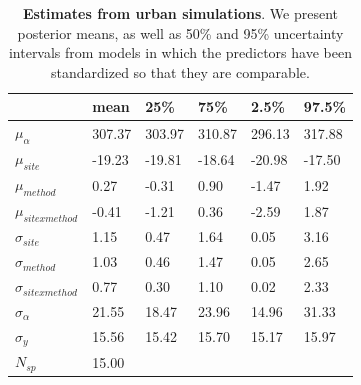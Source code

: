 \documentclass{article}\usepackage[]{graphicx}\usepackage[]{color}
\begin{document}
\begin{table}[ht]
\centering
\caption{\textbf{Estimates from urban simulations}. We present posterior means, as well as 50\% and 95\% uncertainty intervals from models in which the predictors have been standardized so that they are comparable.} 
\label{tab:urban}
\begingroup\footnotesize
\begin{tabular}{|p{}|p{}p{}p{}p{}p{}|}
  \hline
 & mean & 25\% & 75\% & 2.5\% & 97.5\% \\ 
  \hline
$\mu_{\alpha}$ & 307.37 & 303.97 & 310.87 & 296.13 & 317.88 \\ 
  $\mu_{site}$ & -19.23 & -19.81 & -18.64 & -20.98 & -17.50 \\ 
  $\mu_{method}$ & 0.27 & -0.31 & 0.90 & -1.47 & 1.92 \\ 
  $\mu_{sitexmethod}$ & -0.41 & -1.21 & 0.36 & -2.59 & 1.87 \\ 
  $\sigma_{site}$ & 1.15 & 0.47 & 1.64 & 0.05 & 3.16 \\ 
  $\sigma_{method}$ & 1.03 & 0.46 & 1.47 & 0.05 & 2.65 \\ 
  $\sigma_{sitexmethod}$ & 0.77 & 0.30 & 1.10 & 0.02 & 2.33 \\ 
  $\sigma_{\alpha}$ & 21.55 & 18.47 & 23.96 & 14.96 & 31.33 \\ 
  $\sigma_{y}$ & 15.56 & 15.42 & 15.70 & 15.17 & 15.97 \\ 
   \hline
$N_{sp}$ & 15.00 &  &  &  &  \\ 
   \hline
\end{tabular}
\endgroup
\end{table}
\end{document}
